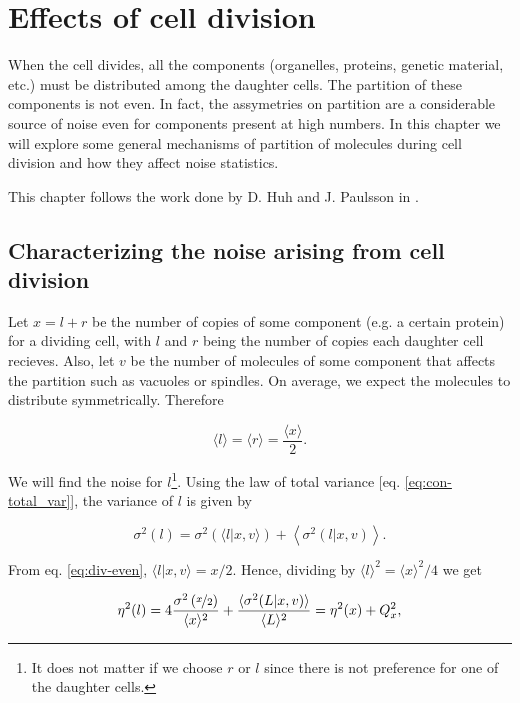 \chapter{Effects of cell division}
\label{ch:div}

When the cell divides, all the components (organelles, proteins, genetic material, etc.) must be distributed among the daughter cells. The partition of these components is not even. In fact, the assymetries on partition are a considerable source of noise even for components present at high numbers. In this chapter we will explore some general mechanisms of partition of molecules during cell division and how they affect noise statistics.

This chapter follows the work done by D. Huh and J. Paulsson in \cite{huh11b}.

\section{Characterizing the noise arising from cell division}

Let $x = l+r$ be the number of copies of some component (e.g. a certain protein) for a dividing cell, with $l$ and $r$ being the number of copies each daughter cell recieves. Also, let $v$ be the number of molecules of some component that affects the partition such as vacuoles or spindles. On average, we expect the molecules to distribute symmetrically. Therefore

\begin{equation}
  \label{eq:div-even}
  \langle l\rangle = \langle r\rangle = \frac{\langle x\rangle}{2}.
\end{equation}

We will find the noise for $l$\footnote{It does not matter if we choose $r$ or $l$ since there is not preference for one of the daughter cells.}. Using the law of total variance [eq. \eqref{eq:con-total_var}], the variance of $l$ is given by

\begin{equation*}
  \sigma^2(l) = \sigma^2\left(\langle l|x,v\rangle\right) + \left\langle\sigma^2(l|x,v)\right\rangle.
\end{equation*}

From eq. \eqref{eq:div-even}, $\langle l|x,v\rangle = x/2$. Hence, dividing by $\langle l\rangle^2 = \langle x\rangle^2/4$ we get

\begin{equation}
  \label{eq:div-noises}
  \eta^2(l) = 4\frac{\sigma^2\left(\nicefrac{x}{2}\right)}{\langle x\rangle^2}+\frac{\langle\sigma^2(L|x,v)\rangle}{\langle L\rangle^2}=\eta^2(x) + Q_x^2,
\end{equation}

